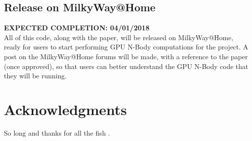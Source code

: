 \documentclass[fleqn,10pt]{SelfArx} %
\begin{document}
\subsection{Release on MilkyWay@Home}
\textbf{EXPECTED COMPLETION: 04/01/2018}\\
All of this code, along with the paper, will be released on MilkyWay@Home, ready for users to start performing GPU N-Body computations for the project. A post on the MilkyWay@Home forums will be made, with a reference to the paper (once approved), so that users can better understand the GPU N-Body code that they will be running.

\section*{Acknowledgments} %


So long and thanks for all the fish \cite{Karras:2012}.




\end{document}
